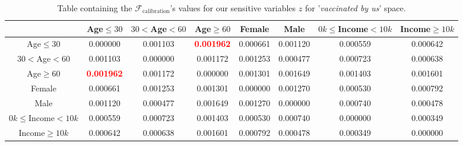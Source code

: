 \documentclass{article}
\begin{document}
\begin{center}
\begin{table}[H]
\begin{adjustbox}{max width=\textwidth}
    \begin{tabular}{ |c| c c c c c c c|}
    \hline
      & Age$\leq30$ &    $30<$Age$<60$ &     Age$\geq60$ &    Female &      Male &   $0k\leq$Income$<10k$ &    Income$\geq10k$  \\
    \hline
     Age$\leq30$ &  0.000000 &  0.001103 & \textbf{\textcolor{red}{0.001962}} &  0.000661 &  0.001120 &  0.000559 &  0.000642 \\
    \hline
    $30<$Age$<60$ &  0.001103 &  0.000000 &  0.001172 &  0.001253 &  0.000477 &  0.000723 &  0.000638 \\
    \hline
    Age$\geq60$ &  \textbf{\textcolor{red}{0.001962}} &  0.001172 &  0.000000 &  0.001301 &  0.001649 &  0.001403 &  0.001601 \\
    \hline
    Female &  0.000661 &  0.001253 &  0.001301 &  0.000000 &  0.001270 &  0.000530 &  0.000792 \\
    \hline
    Male &  0.001120 &  0.000477 &  0.001649 &  0.001270 &  0.000000 &  0.000740 &  0.000478 \\
    \hline
    $0k\leq$Income$<10k$ &  0.000559 &  0.000723 &  0.001403 &  0.000530 &  0.000740 &  0.000000 &  0.000349 \\
    \hline
    Income$\geq10k$ &  0.000642 &  0.000638 &  0.001601 &  0.000792 &  0.000478 &  0.000349 &  0.000000 
    \\ \hline
    \end{tabular}
    \end{adjustbox}
\caption{Table containing the $\mathcal{F}_{\text{calibration}}$'s values for our sensitive variables $z$ for '\textit{vaccinated by us}' space.}
\label{tab:15}
\end{table}
\end{center}
\end{document}
